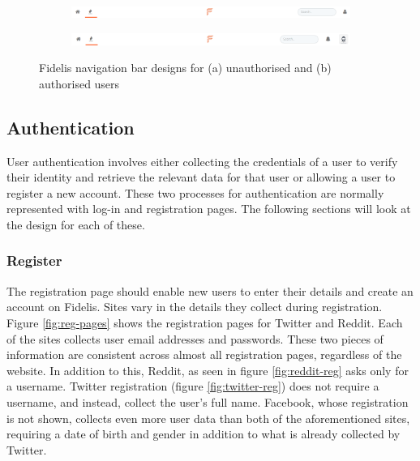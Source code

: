 \begin{figure}[H]
\centering
\begin{subfigure}{1\linewidth}
    \includegraphics[width=1\linewidth]{Images/Design/nav-unauthorised}
    \caption{}
    \label{fig:nav-unauth}
\end{subfigure}
\begin{subfigure}{1\linewidth}
    \includegraphics[width=1\linewidth]{Images/Design/nav-authorised}
    \caption{}
    \label{fig:nav-auth}
\end{subfigure}
\caption{Fidelis navigation bar designs for (a) unauthorised and (b) authorised users}
\label{fig:fidelis-navs}
\end{figure}

\subsection{Authentication}
User authentication involves either collecting the credentials of a user to verify their identity and retrieve the relevant data for that user or allowing a user to register a new account. These two processes for authentication are normally represented with log-in and registration pages. The following sections will look at the design for each of these.

\subsubsection{Register}
The registration page should enable new users to enter their details and create an account on Fidelis. Sites vary in the details they collect during registration. Figure \ref{fig:reg-pages} shows the registration pages for Twitter and Reddit. Each of the sites collects user email addresses and passwords. These two pieces of information are consistent across almost all registration pages, regardless of the website. In addition to this, Reddit, as seen in figure \ref{fig:reddit-reg} asks only for a username. Twitter registration (figure \ref{fig:twitter-reg}) does not require a username, and instead, collect the user's full name. Facebook, whose registration is not shown, collects even more user data than both of the aforementioned sites, requiring a date of birth and gender in addition to what is already collected by Twitter. 

